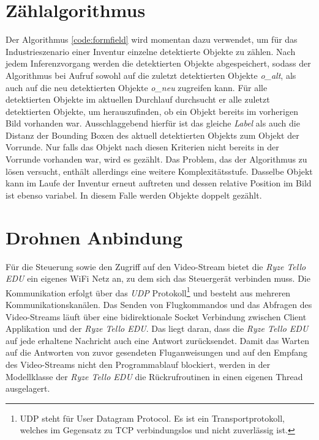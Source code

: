 \section{Zählalgorithmus}



Der Algorithmus \ref{code:formfield} wird momentan dazu verwendet, um für das Industrieszenario einer Inventur einzelne detektierte Objekte zu zählen. Nach jedem Inferenzvorgang werden die detektierten Objekte abgespeichert, sodass der Algorithmus bei Aufruf sowohl auf die zuletzt detektierten Objekte \textit{o\_alt}, als auch auf die neu detektierten Objekte \textit{o\_neu} zugreifen kann. Für alle detektierten Objekte im aktuellen Durchlauf durchsucht er alle zuletzt detektierten Objekte, um herauszufinden, ob ein Objekt bereits im vorherigen Bild vorhanden war. Ausschlaggebend hierfür ist das gleiche \textit{Label} als auch die Distanz der Bounding Boxen des aktuell detektierten Objekts zum Objekt der Vorrunde. Nur falls das Objekt nach diesen Kriterien nicht bereits in der Vorrunde vorhanden war, wird es gezählt. Das Problem, das der Algorithmus zu lösen versucht, enthält allerdings eine weitere Komplexitätsstufe. Dasselbe Objekt kann im Laufe der Inventur erneut auftreten und dessen relative Position im Bild ist ebenso variabel. In diesem Falle werden Objekte doppelt gezählt. 

\section{Drohnen Anbindung}

Für die Steuerung sowie den Zugriff auf den Video-Stream bietet die \textit{Ryze Tello EDU} ein eigenes WiFi Netz an, zu dem sich das Steuergerät verbinden muss. Die Kommunikation erfolgt über das \textit{UDP} Protokoll\footnote{UDP steht für User Datagram Protocol. Es ist ein Transportprotokoll, welches im Gegensatz zu TCP verbindungslos und nicht zuverlässig ist.} und besteht aus mehreren Kommunikationskanälen. Das Senden von Flugkommandos und das Abfragen des Video-Streams läuft über eine bidirektionale Socket Verbindung zwischen Client Applikation und der \textit{Ryze Tello EDU}. Das liegt daran, dass die \textit{Ryze Tello EDU} auf jede erhaltene Nachricht auch eine Antwort zurücksendet. Damit das Warten auf die Antworten von zuvor gesendeten Fluganweisungen und auf den Empfang des Video-Streams nicht den Programmablauf blockiert, werden in der Modellklasse der \textit{Ryze Tello EDU} die Rückrufroutinen in einen eigenen Thread ausgelagert.

